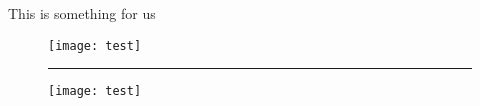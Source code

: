 \documentclass{article}
\begin{document}
\def\testa{}
\pagestyle{fancy}
This is something for us

\begin{figure}[h]
\texttt{[image: test]}
\test
\end{figure}
\lipsum
\begin{figure}
\rule{300pt}{300pt}
\test
\end{figure}
\begin{figure}
\texttt{[image: test]}
{\test}
\end{figure}
\test
\end{document}
